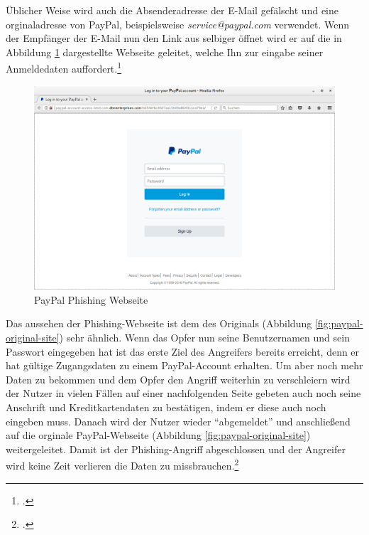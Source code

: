 Üblicher Weise wird auch die Absenderadresse der E-Mail gefälscht und eine orginaladresse von PayPal, beispielsweise \textit{service@paypal.com} verwendet. Wenn der Empfänger der E-Mail nun den Link aus selbiger öffnet wird er auf die in Abbildung \ref{fig:paypal-phishing-site} dargestellte Webseite geleitet, welche Ihn zur eingabe seiner Anmeldedaten auffordert.\footcite[Vgl.][10]{phishing}

\begin{figure}[H]
  \centering
  \includegraphics[width=15cm]{images/paypal-phishing-site}
  \caption{PayPal Phishing Webseite}
  \label{fig:paypal-phishing-site}
\end{figure}

Das aussehen der Phishing-Webseite ist dem des Originals (Abbildung \ref{fig:paypal-original-site}) sehr ähnlich. Wenn das Opfer nun seine Benutzernamen und sein Passwort eingegeben hat ist das erste Ziel des Angreifers bereits erreicht, denn er hat gültige Zugangsdaten zu einem PayPal-Account erhalten. Um aber noch mehr Daten zu bekommen und dem Opfer den Angriff weiterhin zu verschleiern wird der Nutzer in vielen Fällen auf einer nachfolgenden Seite gebeten auch noch seine Anschrift und Kreditkartendaten zu bestätigen, indem er diese auch noch eingeben muss. Danach wird der Nutzer wieder \enquote{abgemeldet} und anschließend auf die orginale PayPal-Webseite (Abbildung \ref{fig:paypal-original-site}) weitergeleitet. Damit ist der Phishing-Angriff abgeschlossen und der Angreifer wird keine Zeit verlieren die Daten zu missbrauchen.\footcite[Vgl.][10\psqq]{phishing}


